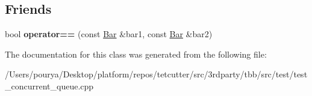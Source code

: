 \subsection*{Friends}
\begin{DoxyCompactItemize}
\item 
\hypertarget{classBar_aabc0910bae78469787a4c44dabb84be2}{}bool {\bfseries operator==} (const \hyperlink{classBar}{Bar} \&bar1, const \hyperlink{classBar}{Bar} \&bar2)\label{classBar_aabc0910bae78469787a4c44dabb84be2}

\end{DoxyCompactItemize}


The documentation for this class was generated from the following file\+:\begin{DoxyCompactItemize}
\item 
/\+Users/pourya/\+Desktop/platform/repos/tetcutter/src/3rdparty/tbb/src/test/test\+\_\+concurrent\+\_\+queue.\+cpp\end{DoxyCompactItemize}
